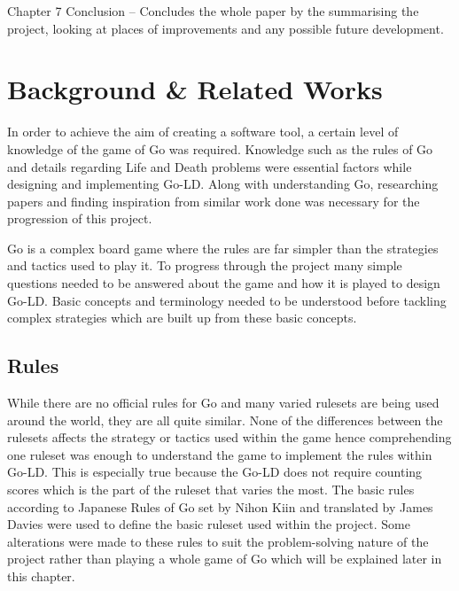 \documentclass{l4proj}
\begin{document}
Chapter 7 Conclusion – Concludes the whole paper by the summarising the project, looking at places of improvements and any possible future development.








\chapter{Background \& Related Works}
In order to achieve the aim of creating a software tool, a certain level of knowledge of the game of Go was required. Knowledge such as the rules of Go and details regarding Life and Death problems were essential factors while designing and implementing Go-LD. Along with understanding Go, researching papers and finding inspiration from similar work done was necessary for the progression of this project.

Go is a complex board game where the rules are far simpler than the strategies and tactics used to play it.  To progress through the project many simple questions needed to be answered about the game and how it is played to design Go-LD. Basic concepts and terminology needed to be understood before tackling complex strategies which are built up from these basic concepts.

\section{Rules}

While there are no official rules for Go and many varied rulesets are being used around the world, they are all quite similar. None of the differences between the rulesets affects the strategy or tactics used within the game hence comprehending one ruleset was enough to understand the game to implement the rules within Go-LD. This is especially true because the Go-LD does not require counting scores which is the part of the ruleset that varies the most. The basic rules according to Japanese Rules of Go set by Nihon Kiin and translated by James Davies \citep{NihonKiinRules} were used to define the basic ruleset used within the project. Some alterations were made to these rules to suit the problem-solving nature of the project rather than playing a whole game of Go which will be explained later in this chapter.
\end{document}
